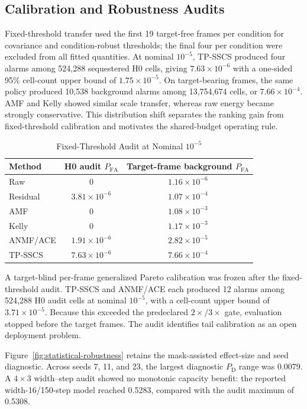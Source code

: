 \documentclass[journal]{IEEEtran}
\begin{document}
\subsection{Calibration and Robustness Audits}

Fixed-threshold transfer used the first 19 target-free frames per condition for covariance and condition-robust thresholds; the final four per condition were excluded from all fitted quantities. At nominal $10^{-5}$, TP-SSCS produced four alarms among 524,288 sequestered H0 cells, giving $7.63\times10^{-6}$ with a one-sided 95\% cell-count upper bound of $1.75\times10^{-5}$. On target-bearing frames, the same policy produced 10,538 background alarms among 13,754,674 cells, or $7.66\times10^{-4}$. AMF and Kelly showed similar scale transfer, whereas raw energy became strongly conservative. This distribution shift separates the ranking gain from fixed-threshold calibration and motivates the shared-budget operating rule.

\begin{table}[t]
\caption{Fixed-Threshold Audit at Nominal $10^{-5}$}
\label{tab:threshold-audit}
\centering
\footnotesize
\setlength{\tabcolsep}{3.0pt}
\renewcommand{\arraystretch}{1.08}
\begin{tabular}{@{}lcc@{}}
\toprule
Method & H0 audit $P_{\mathrm{FA}}$ & Target-frame background $P_{\mathrm{FA}}$ \\
\midrule
Raw & 0 & $1.16\times10^{-6}$ \\
Residual & $3.81\times10^{-6}$ & $1.07\times10^{-4}$ \\
AMF & 0 & $1.08\times10^{-3}$ \\
Kelly & 0 & $1.17\times10^{-3}$ \\
ANMF/ACE & $1.91\times10^{-6}$ & $2.82\times10^{-5}$ \\
TP-SSCS & $7.63\times10^{-6}$ & $7.66\times10^{-4}$ \\
\bottomrule
\end{tabular}
\end{table}

A target-blind per-frame generalized Pareto calibration was frozen after the fixed-threshold audit. TP-SSCS and ANMF/ACE each produced 12 alarms among 524,288 H0 audit cells at nominal $10^{-5}$, with a cell-count upper bound of $3.71\times10^{-5}$. Because this exceeded the predeclared $2\times/3\times$ gate, evaluation stopped before the target frames. The audit identifies tail calibration as an open deployment problem.

Figure~\ref{fig:statistical-robustness} retains the mask-assisted effect-size and seed diagnostic. Across seeds 7, 11, and 23, the largest diagnostic $P_{\mathrm{D}}$ range was 0.0079. A $4\times3$ width--step audit showed no monotonic capacity benefit: the reported width-16/150-step model reached 0.5283, compared with the audit maximum of 0.5308.
\end{document}
